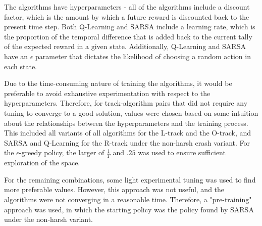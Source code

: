 \documentclass{amsart}
\begin{document}
    The algorithms have hyperparameters - all of the algorithms include a discount factor, which is the amount by which
    a future reward is discounted back to the present time step. Both Q-Learning and SARSA include a
    learning rate, which is the proportion of the temporal difference that is added back to the current tally of the
    expected reward in a given state. Additionally, Q-Learning and SARSA have an $\epsilon$ parameter that dictates
    the likelihood of choosing a random action in each state.

    Due to the time-consuming nature of training the algorithms, it would be preferable to avoid exhaustive
    experimentation with respect to the hyperparameters. Therefore, for track-algorithm pairs that
    did not require any tuning to converge to a good solution, values were chosen based on some intuition about the
    relationships between the hyperparameters and the training process. This included all variants of all algorithms
    for the L-track and the O-track, and SARSA and Q-Learning for the R-track under the non-harsh
    crash variant. For the $\epsilon$-greedy policy, the larger of $\frac{1}{T}$ and $.25$ was used to ensure
    sufficient exploration of the space.

    For the remaining combinations, some light experimental tuning was used to find more preferable values. However,
    this approach was not useful, and the algorithms were not converging in a reasonable time. Therefore, a
    "pre-training" approach was used, in which the starting policy was the policy found by SARSA
    under the non-harsh variant.
\end{document}
